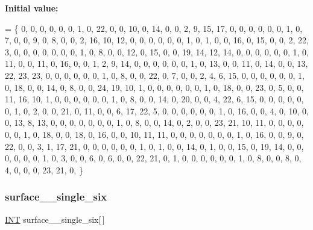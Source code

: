 {\bfseries Initial value\+:}
\begin{DoxyCode}
= \{
    0, 0, 0, 0, 0, 0, 1, 0, 22, 0, 0, 10, 0, 14, 0, 0, 2, 9, 15, 17, 
    0, 0, 0, 0, 0, 0, 1, 0, 7, 0, 0, 9, 0, 8, 0, 0, 2, 16, 10, 12, 
    0, 0, 0, 0, 0, 0, 1, 0, 1, 0, 0, 16, 0, 15, 0, 0, 2, 22, 3, 0, 
    0, 0, 0, 0, 0, 0, 1, 0, 8, 0, 0, 12, 0, 15, 0, 0, 19, 14, 12, 14, 
    0, 0, 0, 0, 0, 0, 1, 0, 11, 0, 0, 11, 0, 16, 0, 0, 1, 2, 9, 14, 
    0, 0, 0, 0, 0, 0, 1, 0, 13, 0, 0, 11, 0, 14, 0, 0, 13, 22, 23, 23, 
    0, 0, 0, 0, 0, 0, 1, 0, 8, 0, 0, 22, 0, 7, 0, 0, 2, 4, 6, 15, 
    0, 0, 0, 0, 0, 0, 1, 0, 18, 0, 0, 14, 0, 8, 0, 0, 24, 19, 10, 1, 
    0, 0, 0, 0, 0, 0, 1, 0, 18, 0, 0, 23, 0, 5, 0, 0, 11, 16, 10, 1, 
    0, 0, 0, 0, 0, 0, 1, 0, 8, 0, 0, 14, 0, 20, 0, 0, 4, 22, 6, 15, 
    0, 0, 0, 0, 0, 0, 1, 0, 2, 0, 0, 21, 0, 11, 0, 0, 6, 17, 22, 5, 
    0, 0, 0, 0, 0, 0, 1, 0, 16, 0, 0, 4, 0, 10, 0, 0, 13, 8, 13, 0, 
    0, 0, 0, 0, 0, 0, 1, 0, 8, 0, 0, 14, 0, 2, 0, 0, 23, 21, 10, 11, 
    0, 0, 0, 0, 0, 0, 1, 0, 18, 0, 0, 18, 0, 16, 0, 0, 10, 11, 11, 0, 
    0, 0, 0, 0, 0, 0, 1, 0, 16, 0, 0, 9, 0, 22, 0, 0, 3, 1, 17, 21, 
    0, 0, 0, 0, 0, 0, 1, 0, 1, 0, 0, 14, 0, 1, 0, 0, 15, 0, 19, 14, 
    0, 0, 0, 0, 0, 0, 1, 0, 3, 0, 0, 6, 0, 6, 0, 0, 22, 21, 0, 1, 
    0, 0, 0, 0, 0, 0, 1, 0, 8, 0, 0, 8, 0, 4, 0, 0, 0, 23, 21, 0, 
\}
\end{DoxyCode}
\mbox{\label{surface__25_8_c_ac99d5954a49ee326a414d86cb15489e0}} 
\subsubsection{\texorpdfstring{surface\+\_\+\_\+single\+\_\+six}{surface\_25\_single\_six}}
{\footnotesize\ttfamily \mbox{\hyperlink{galois_8h_a09fddde158a3a20bd2dcadb609de11dc}{I\+NT}} surface\+\_\+\_\+single\+\_\+six\mbox{[}$\,$\mbox{]}}

